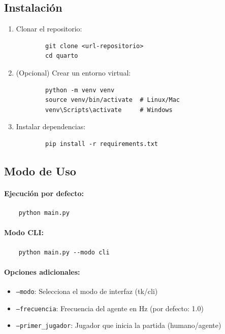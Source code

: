 \documentclass[conference]{IEEEtran}
\begin{document}
\subsection{Instalación}
\begin{enumerate}
	\item Clonar el repositorio:
	\begin{verbatim}
		git clone <url-repositorio>
		cd quarto
	\end{verbatim}
	
	\item (Opcional) Crear un entorno virtual:
	\begin{verbatim}
		python -m venv venv
		source venv/bin/activate  # Linux/Mac
		venv\Scripts\activate     # Windows
	\end{verbatim}
	
	\item Instalar dependencias:
	\begin{verbatim}
		pip install -r requirements.txt
	\end{verbatim}
\end{enumerate}

\subsection{Modo de Uso}

\paragraph{Ejecución por defecto:}
\begin{verbatim}
	python main.py
\end{verbatim}

\paragraph{Modo CLI:}
\begin{verbatim}
	python main.py --modo cli
\end{verbatim}

\paragraph{Opciones adicionales:}
\begin{itemize}
	\item \texttt{--modo}: Selecciona el modo de interfaz (tk/cli)
	\item \texttt{--frecuencia}: Frecuencia del agente en Hz (por defecto: 1.0)
	\item \texttt{--primer\_jugador}: Jugador que inicia la partida (humano/agente)
\end{itemize}
\end{document}
